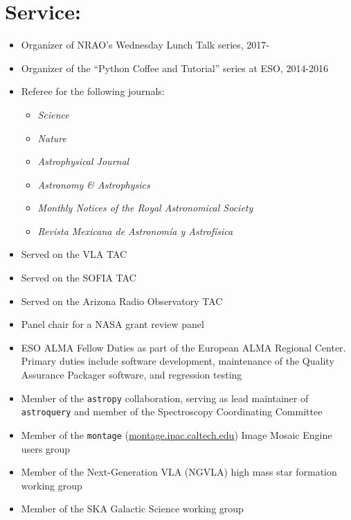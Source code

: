 
\section*{Service:}
\vspace{-10pt}
\begin{itemize}
\itemsep-3pt
        
    \item Organizer of NRAO's Wednesday Lunch Talk series, 2017-
    \item Organizer of the ``Python Coffee and Tutorial'' series at ESO, 2014-2016
    \item Referee for the following journals:
        \begin{itemize}
            \itemsep-3pt
            \item \textit{Science}
            \item \textit{Nature}
            \item \textit{Astrophysical Journal}
            \item \textit{Astronomy \& Astrophysics}
            \item \textit{Monthly Notices of the Royal Astronomical Society}
            \item \textit{Revista Mexicana de Astronom{\'i}a y Astrof{\'i}sica}
    \end{itemize}
    \item Served on the VLA TAC
    \item Served on the SOFIA TAC
    \item Served on the Arizona Radio Observatory TAC
    \item Panel chair for a NASA grant review panel
    \item ESO ALMA Fellow Duties as part of the European ALMA Regional Center.
        Primary duties include software development, maintenance of the
        Quality Assurance Packager software, and regression testing
    \item Member of the \texttt{astropy} collaboration, serving as lead maintainer
        of \texttt{astroquery} and member of the Spectroscopy Coordinating Committee
    \item Member of the \texttt{montage} (\url{montage.ipac.caltech.edu}) Image
        Mosaic Engine users group
    \item Member of the Next-Generation VLA (NGVLA) high mass star formation
        working group
    \item Member of the SKA Galactic Science
        working group
\end{itemize}
